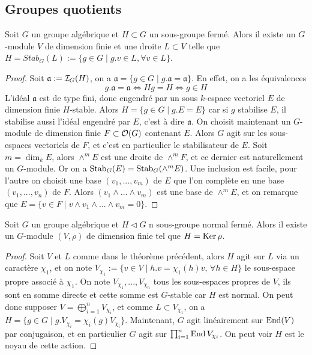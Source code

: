 \subsection{Groupes quotients}
\begin{thm}[Chevalley]
Soit $G$ un groupe algébrique et $H\subset G$ un sous-groupe fermé. Alors il existe un $G$-module $V$ de dimension finie et une droite $L\subset V$ telle que $H=Stab_G(L):=\lbrace g\in G\mid g.v\in L,\forall v\in L\rbrace$.
\end{thm}
\begin{proof}
Soit $\mathfrak{a}:=\mathcal{I}_G(H)$, on a  $\mathfrak{a}=\lbrace g\in G\mid g.\mathfrak{a}=\mathfrak{a}\rbrace$. En effet, on a les équivalences
$$g.\mathfrak{a}=\mathfrak{a}\iff Hg=H\iff g\in H$$
L'idéal $\mathfrak{a}$ est de type fini, donc engendré par un sous $k$-espace vectoriel $E$ de dimension finie $H$-stable. Alors $H=\lbrace g\in G\mid g.E=E\rbrace$ car si $g$ stabilise $E$, il stabilise aussi l'idéal engendré par $E$, c'est à dire $\mathfrak{a}$. On choisit maintenant un $G$-module de dimension finie $F\subset \mathcal{O}(G)$ contenant $E$. Alors $G$ agit sur les sous-espaces vectoriels de $F$, et c'est en particulier le stabilisateur de $E$. Soit $m=\dim_k E$, alors $\wedge^mE$ est une droite de $\wedge^mF$, et ce dernier est naturellement un $G$-module. Or on a $\operatorname{Stab}_G(E)=\operatorname{Stab}_G(\wedge^mE)$. Une inclusion est facile, pour l'autre on choisit une base $(v_1,...,v_m)$ de $E$ que l'on complète en une base $(v_1,...,v_n)$ de $F$. Alors $(v_1\wedge...\wedge v_m)$ est une base de $\wedge^mE$, et on remarque que $E=\lbrace v\in F\mid v\wedge v_1\wedge...\wedge v_m=0\rbrace$.
\end{proof}


\begin{thm}[Chevalley]
Soit $G$ un groupe algébrique et $H\lhd G$ n sous-groupe normal fermé. Alors il existe un $G$-module $(V, \rho)$ de dimension finie tel que $H=\operatorname{Ker}{\rho}$.
\end{thm}
\begin{proof}
Soit $V$ et $L$ comme dans le théorème précédent, alors $H$ agit sur $L$ via un caractère $\chi_1$, et on note $V_{\chi_1}:=\lbrace v\in V\mid h.v=\chi_1(h)v,\, \forall h\in H\rbrace$ le sous-espace propre associé à $\chi_1$. On note $V_{\chi_1},...,V_{\chi_n}$ tous les sous-espaces propres de $V$, ils sont en somme directe et cette somme est $G$-stable car $H$ est normal. On peut donc supposer $V=\bigoplus_{i=1}^nV_{\chi_i}$, et comme $L\subset V_{\chi_1}$, on a $H=\lbrace g\in G\mid g.V_{\chi_i}=\chi_i(g)V_{\chi_i}\rbrace$. Maintenant, $G$ agit linéairement sur $\operatorname{End}(V)$ par conjugaison, et en particulier $G$ agit sur $\prod_{i=1}^n\operatorname{End} V_{\chi_i}$. On peut voir $H$ est le noyau de cette action.
\end{proof}

